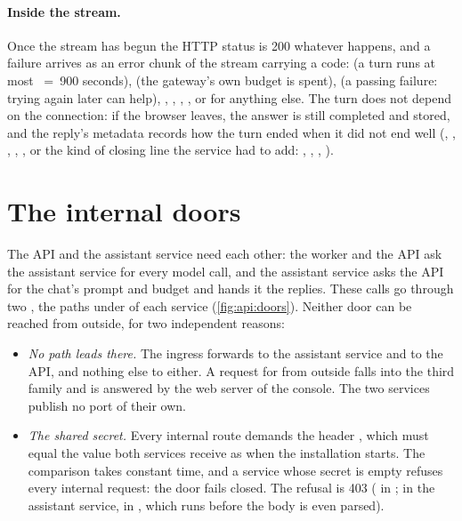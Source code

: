 \paragraph{Inside the stream.} Once the stream has begun the HTTP status is 200 whatever
happens, and a failure arrives as an error chunk of the stream carrying a code:
 (a turn runs at most ~=~900 seconds),
 (the gateway's own budget is spent),  (a
passing failure: trying again later can help), ,
, , , or
 for anything else. The turn does not depend on the connection: if the
browser leaves, the answer is still completed and stored, and the reply's metadata records how
the turn ended when it did not end well (, , ,
, , or the kind of closing line the service had to add:
, , , ).


\section{The internal doors}\label{sec:api:internal}

The API and the assistant service need each other: the worker and the API ask the assistant
service for every model call, and the assistant service asks the API for the chat's prompt and
budget and hands it the replies. These calls go through two , the paths
under  of each service (\cref{fig:api:doors}). Neither door can be reached from
outside, for two independent reasons:

\begin{itemize}
  \item \emph{No path leads there.} The ingress forwards  to the
    assistant service and  to the API, and nothing else to either. A request for
     from outside falls into the third family and is answered by the web
    server of the console. The two services publish no port of their own.
  \item \emph{The shared secret.} Every internal route demands the header
    , which must equal the value both services receive as
     when the installation starts. The comparison takes
    constant time, and a service whose secret is empty refuses every internal request: the
    door fails closed. The refusal is 403  ( in
    ; in the assistant service, 
    in , which runs before the body is even parsed).
\end{itemize}

